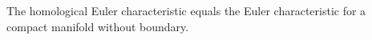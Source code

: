 The homological Euler characteristic equals the Euler characteristic for a compact manifold without boundary.
